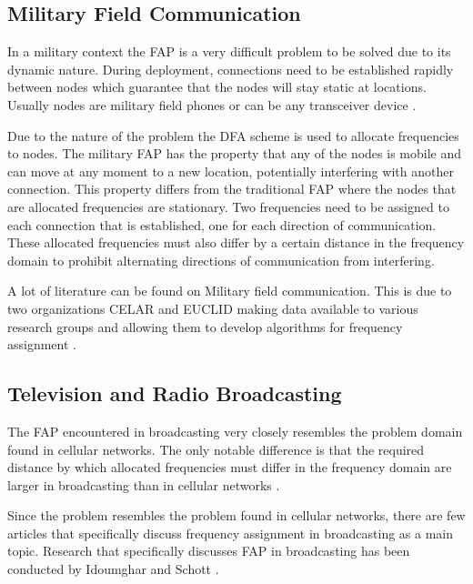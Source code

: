 \subsection{Military Field Communication}
In a military context the \gls{FAP} is a very difficult problem to be solved due to its dynamic nature\cite{CALMA}. During deployment, connections need to be established rapidly between nodes which guarantee that the nodes will stay static at locations. Usually nodes are military field phones or can be any transceiver device \cite{CALMA,DynamicFAP}. 

Due to the nature of the problem the \gls{DFA} scheme is used to allocate frequencies to nodes. The military \gls{FAP} has the property that any of the nodes is mobile and can move at any moment to a new location, potentially interfering with another connection\cite{CALMA,DynamicFAP}. This property differs from the traditional \gls{FAP} where the nodes that are allocated frequencies are stationary\cite{CALMA}. Two frequencies need to be assigned to each connection that is established, one for each direction of communication. These allocated frequencies must also differ by a certain distance in the frequency domain to prohibit alternating directions of communication from interfering\cite{CALMA,DynamicFAP}.

A lot of literature can be found on Military field communication. This is due to two organizations CELAR and \gls{EUCLID} making data available to various research groups and allowing them to develop algorithms for frequency assignment \cite{CALMA,DynamicFAP}. 

\subsection{Television and Radio Broadcasting}
The \gls{FAP} encountered in broadcasting very closely resembles the problem domain found in cellular networks\cite{Karen2004}. The only notable difference is that the required distance by which allocated frequencies must differ in the frequency domain are larger in broadcasting than in cellular networks \cite{Karen2004}.

Since the problem resembles the problem found in cellular networks, there are few articles that specifically discuss frequency assignment in broadcasting as a main topic. Research that specifically discusses \gls{FAP} in broadcasting has been conducted by Idoumghar and Schott \cite{RadioFAP}.
